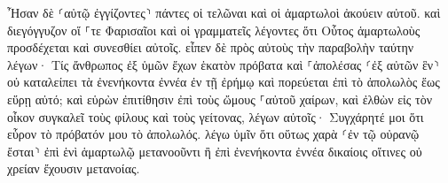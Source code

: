 \documentclass{openreader}
\begin{document}
Ἦσαν δὲ ⸂αὐτῷ ἐγγίζοντες⸃ πάντες οἱ τελῶναι καὶ οἱ ἁμαρτωλοὶ ἀκούειν αὐτοῦ. 
καὶ διεγόγγυζον οἵ ⸀τε Φαρισαῖοι καὶ οἱ γραμματεῖς λέγοντες ὅτι Οὗτος ἁμαρτωλοὺς προσδέχεται καὶ συνεσθίει αὐτοῖς. 
εἶπεν δὲ πρὸς αὐτοὺς τὴν παραβολὴν ταύτην λέγων· 
Τίς ἄνθρωπος ἐξ ὑμῶν ἔχων ἑκατὸν πρόβατα καὶ ⸀ἀπολέσας ⸂ἐξ αὐτῶν ἓν⸃ οὐ καταλείπει τὰ ἐνενήκοντα ἐννέα ἐν τῇ ἐρήμῳ καὶ πορεύεται ἐπὶ τὸ ἀπολωλὸς ἕως εὕρῃ αὐτό; 
καὶ εὑρὼν ἐπιτίθησιν ἐπὶ τοὺς ὤμους ⸀αὐτοῦ χαίρων, 
καὶ ἐλθὼν εἰς τὸν οἶκον συγκαλεῖ τοὺς φίλους καὶ τοὺς γείτονας, λέγων αὐτοῖς· Συγχάρητέ μοι ὅτι εὗρον τὸ πρόβατόν μου τὸ ἀπολωλός. 
λέγω ὑμῖν ὅτι οὕτως χαρὰ ⸂ἐν τῷ οὐρανῷ ἔσται⸃ ἐπὶ ἑνὶ ἁμαρτωλῷ μετανοοῦντι ἢ ἐπὶ ἐνενήκοντα ἐννέα δικαίοις οἵτινες οὐ χρείαν ἔχουσιν μετανοίας. 
\end{document}
